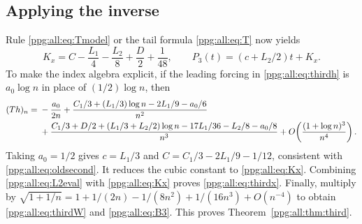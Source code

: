 \documentclass[11pt,letterpaper]{article}
\theoremstyle{remark}\newtheorem{remark}[theorem]{Remark}
\numberwithin{equation}{section}
\begin{document}
\subsection{Applying the inverse}
Rule \eqref{ppg:all:eq:Tmodel} or the tail formula \eqref{ppg:all:eq:T} now yields
\begin{equation}\label{ppg:all:eq:Kx}
 K_x=C-\frac{L_1}4-\frac{L_2}8+\frac D2+\frac1{48},
 \qquad P_3(t)=(c+L_2/2)t+K_x.
\end{equation}
To make the index algebra explicit, if the leading forcing in \eqref{ppg:all:eq:thirdh} is $a_0\log n$ in place of $(1/2)\log n$, then
\begin{align}
 (Th)_n={}&-\frac{a_0}{2n}
 +\frac{C_1/3+(L_1/3)\log n-2L_1/9-a_0/6}{n^2}\notag\\
 &+\frac{C_1/3+D/2+(L_1/3+L_2/2)\log n
                   -17L_1/36-L_2/8-a_0/8}{n^3}
 +O\!\left(\frac{(1+\log n)^3}{n^4}\right).\label{ppg:all:eq:inverse3}
\end{align}
Taking $a_0=1/2$ gives $c=L_1/3$ and
$C=C_1/3-2L_1/9-1/12$, consistent with \eqref{ppg:all:eq:oldsecond}. It reduces the cubic constant to \eqref{ppg:all:eq:Kx}. Combining \eqref{ppg:all:eq:L2eval} with \eqref{ppg:all:eq:Kx} proves \eqref{ppg:all:eq:thirdx}. Finally, multiply by
$\sqrt{1+1/n}=1+1/(2n)-1/(8n^2)+1/(16n^3)+O(n^{-4})$
to obtain \eqref{ppg:all:eq:thirdW} and \eqref{ppg:all:eq:B3}. This proves Theorem~\ref{ppg:all:thm:third}.
\end{document}
